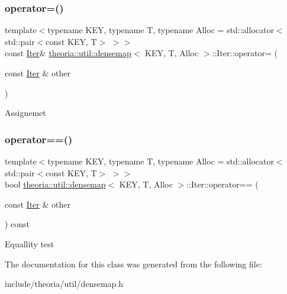 \subsubsection{\texorpdfstring{operator=()}{operator=()}}
{\footnotesize\ttfamily template$<$typename K\+EY, typename T, typename Alloc = std\+::allocator$<$std\+::pair$<$const K\+E\+Y, T$>$ $>$$>$ \\
const \hyperlink{classtheoria_1_1util_1_1densemap_1_1Iter}{Iter}\& \hyperlink{classtheoria_1_1util_1_1densemap}{theoria\+::util\+::densemap}$<$ K\+EY, T, Alloc $>$\+::Iter\+::operator= (\begin{DoxyParamCaption}\item[{const \hyperlink{classtheoria_1_1util_1_1densemap_1_1Iter}{Iter} \&}]{other }\end{DoxyParamCaption})\hspace{0.3cm}{\ttfamily [inline]}}

Assignemet \mbox{\label{classtheoria_1_1util_1_1densemap_1_1Iter_a70b1de08a54e34afd57cce65d093eecb}} 
\subsubsection{\texorpdfstring{operator==()}{operator==()}}
{\footnotesize\ttfamily template$<$typename K\+EY, typename T, typename Alloc = std\+::allocator$<$std\+::pair$<$const K\+E\+Y, T$>$ $>$$>$ \\
bool \hyperlink{classtheoria_1_1util_1_1densemap}{theoria\+::util\+::densemap}$<$ K\+EY, T, Alloc $>$\+::Iter\+::operator== (\begin{DoxyParamCaption}\item[{const \hyperlink{classtheoria_1_1util_1_1densemap_1_1Iter}{Iter} \&}]{other }\end{DoxyParamCaption}) const\hspace{0.3cm}{\ttfamily [inline]}}

Equallity test 

The documentation for this class was generated from the following file\+:\begin{DoxyCompactItemize}
\item 
include/theoria/util/densemap.\+h\end{DoxyCompactItemize}
